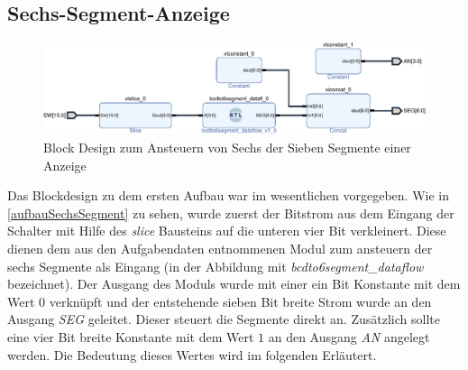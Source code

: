 \documentclass[11pt, a4paper]{article}
\begin{document}
\subsection*{Sechs-Segment-Anzeige}
\begin{figure}[htb]    
    \centering
    \includegraphics[width=\linewidth]{versuch1Data/seven_segment_display1.pdf}
    \caption{Block Design zum Ansteuern von Sechs der Sieben Segmente einer Anzeige}
    \label{aufbauSechsSegment}        
\end{figure}
Das Blockdesign zu dem ersten Aufbau war im wesentlichen vorgegeben. Wie in \autoref{aufbauSechsSegment} zu sehen, wurde zuerst der Bitstrom aus dem Eingang der Schalter mit Hilfe des \textit{slice} Bausteins auf die unteren vier Bit verkleinert. Diese dienen dem aus den Aufgabendaten entnommenen Modul zum ansteuern der sechs Segmente als Eingang (in der Abbildung mit \textit{bcdto6segment\_dataflow} bezeichnet). Der Ausgang des Moduls wurde mit einer ein Bit Konstante mit dem Wert $0$ verknüpft und der entstehende sieben Bit breite Strom wurde an den Ausgang \textit{SEG} geleitet. Dieser steuert die Segmente direkt an.
Zusätzlich sollte eine vier Bit breite Konstante mit dem Wert $1$ an den Ausgang \textit{AN} angelegt werden. Die Bedeutung dieses Wertes wird im folgenden Erläutert.
\end{document}
